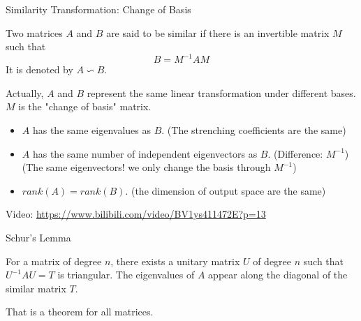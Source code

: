 \documentclass{beamer}
\begin{document}
\begin{frame}{Similarity Transformation: Change of Basis}
    \begin{definition}
        Two matrices $A$ and $B$ are said to be similar if there is an invertible matrix $M$ such that
        \begin{equation*}
            B=M^{-1}AM
        \end{equation*}
        It is denoted by $A\backsim B$.
    \end{definition}

Actually, $A$ and $B$ represent the same linear transformation under different bases. $M$ is the "change of basis" matrix.

\begin{itemize}
    \item $A$ has the same eigenvalues as $B$. (The strenching coefficients are the same)
    \item $A$ has the same number of independent eigenvectors as $B$. (Difference: $M^{-1}$) (The same eigenvectors! we only change the basis through $M^{-1}$)
    \item $rank (A) = rank (B)$. (the dimension of output space are the same)
\end{itemize}

Video: \url{https://www.bilibili.com/video/BV1ys411472E?p=13}

\end{frame}

\begin{frame}{Schur's Lemma}
\begin{theorem}
    For a matrix of degree $n$, there exists a unitary matrix $U$ of degree $n$ such that $U^{-1}AU=T$ is triangular. The eigenvalues of $A$ appear along the diagonal of the similar matrix $T$.
\end{theorem}

That is a theorem for all matrices.
\end{frame}
\end{document}
